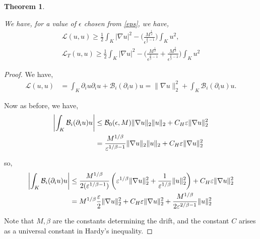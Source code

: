 \documentclass{article}
\theoremstyle{plain}
\newtheorem{theorem}{Theorem}
\theoremstyle{definition}
\theoremstyle{plain}
\newcommand{\eps}{\epsilon}
\newcommand{\B}{\mathcal{B}}
\begin{document}
\begin{theorem}\label{thm5}

We have, for a value of $\eps$ chosen from \cref{eps}, we have, 
\begin{align}   \mathcal{L}(u,u)\geq \frac{1}{2} \int_K |\nabla u|^2 -\Bigg( \frac{M^{\frac{1}{\beta}}}{\eps^{\frac{2}{\beta}-1}} \Bigg)  \int_{K} u^2 ,\\   \mathcal{L}_T(u,u)\geq \frac{1}{2} \int_K |\nabla u|^2 -\Big(  \frac{M^{\frac{1}{\beta}}}{\eps^{\frac{2}{\beta}-1}} + \frac{M^{\frac{2}{\beta}}}{{\eps^{\frac{2}{\beta}-2}}}  \Big)  \int_{K} u^2
\end{align}
\end{theorem}
\begin{proof}
We have,
\begin{align}
\mathcal{L}(u,u) &= \int_K \partial_i u \partial_i u + \mathcal{B}_i(\partial_i u)u
= \|\nabla u\|_2^2 + \int_K \mathcal{B}_i(\partial_i u)u.
\end{align}

Now as before, we have,
\begin{align}
\left|\int_K \mathcal{B}_i(\partial_i u)u\right|
&\leq \mathcal{B}_0(\eps,M) \|\nabla u\|_2 \|u\|_2 + C_H \varepsilon \|\nabla u\|_2^2 \notag \\
&= \frac{M^{1/\beta}}{\varepsilon^{1/\beta -1}} \|\nabla u\|_2 \|u\|_2 + C_H \varepsilon \|\nabla u\|_2^2
\end{align}

so,
\begin{align}
\left|\int_K \mathcal{B}_i(\partial_i u)u\right|
&\leq \frac{M^{1/\beta}}{2(\varepsilon^{1/\beta -1})}
\left(\varepsilon^{1/\beta}\|\nabla u\|_2^2 + \frac{1}{\varepsilon^{1/\beta}}\|u\|_2^2\right)
+ C_H \varepsilon\|\nabla u\|_2^2 \notag \\
&= M^{1/\beta}\frac{\varepsilon}{2} \|\nabla u\|_2^2 + C_H \varepsilon\|\nabla u\|_2^2
+ \frac{M^{1/\beta}}{2\varepsilon^{2/\beta -1}}\|u\|_2^2
\end{align}

Note that $M, \beta$ are the constants determining the drift, and the constant $C$ arises as a universal constant in Hardy's inequality.


\end{proof}
\end{document}
